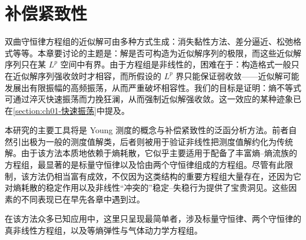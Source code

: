 \documentclass[../main.tex]{subfiles}
\begin{document}
\chapter{补偿紧致性}\label{chapter:ch17-补偿紧致性}

双曲守恒律方程组的近似解可由多种方式生成：消失黏性方法、差分逼近、松弛格式等等。本章要讨论的主题是：解是否可构造为近似解序列的极限，而这些近似解序列只在某 $L^p$ 空间中有界。由于方程组是非线性的，困难在于：构造格式一般只在近似解序列强收敛时才相容，而所假设的 $L^p$ 界只能保证弱收敛——近似解可能发展出有限振幅的高频振荡，从而严重破坏相容性。我们的目标是证明：熵不等式可通过淬灭快速振荡而力挽狂澜，从而强制近似解强收敛。这一效应的某种迹象已在\cref{section:ch01-快速振荡}中提及。

本研究的主要工具将是 Young 测度的概念与补偿紧致性的泛函分析方法。前者自然引出极为一般的测度值解类，后者则被用于验证非线性把测度值解约化为传统解。由于该方法本质地依赖于熵耗散，它似乎主要适用于配备了丰富熵--熵流族的方程组，最显著的是标量守恒律以及恰由两个守恒律组成的方程组。尽管有此限制，该方法仍相当富有成效，不仅因为这类结构的重要方程组大量存在，还因为它对熵耗散的稳定作用以及非线性“冲突的”稳定--失稳行为提供了宝贵洞见。这些因素的不同表现已在早先各章中遇到过。

在该方法众多已知应用中，这里只呈现最简单者，涉及标量守恒律、两个守恒律的真非线性方程组，以及等熵弹性与气体动力学方程组。










\end{document}
